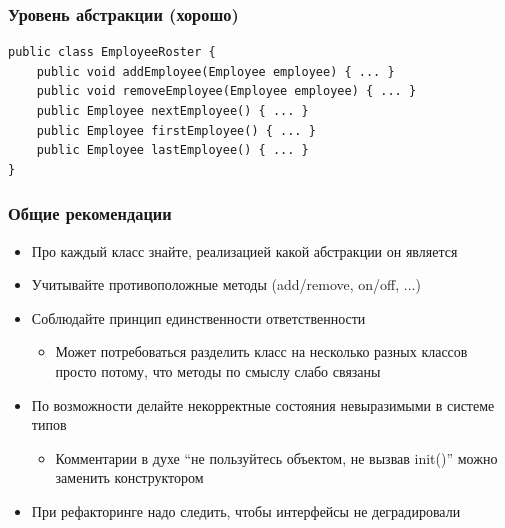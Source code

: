 \documentclass[xetex,mathserif,serif]{beamer}
\begin{document}
	\begin{frame}[fragile]
		\frametitle{Уровень абстракции (хорошо)}
		\begin{verbatim}
public class EmployeeRoster {
    public void addEmployee(Employee employee) { ... }
    public void removeEmployee(Employee employee) { ... }
    public Employee nextEmployee() { ... }
    public Employee firstEmployee() { ... }
    public Employee lastEmployee() { ... }
}
		\end{verbatim}
	\end{frame}

	\begin{frame}
		\frametitle{Общие рекомендации}
		\begin{itemize}
			\item Про каждый класс знайте, реализацией какой абстракции он является
			\item Учитывайте противоположные методы (add/remove, on/off, ...)
			\item Соблюдайте принцип единственности ответственности
			\begin{itemize}
				\item Может потребоваться разделить класс на несколько разных классов просто потому, что методы по смыслу слабо связаны
			\end{itemize}
			\item По возможности делайте некорректные состояния невыразимыми в системе типов
			\begin{itemize}
				\item Комментарии в духе ``не пользуйтесь объектом, не вызвав  init()'' можно заменить конструктором
			\end{itemize}
			\item При рефакторинге надо следить, чтобы интерфейсы не деградировали
		\end{itemize}
	\end{frame}
\end{document}
